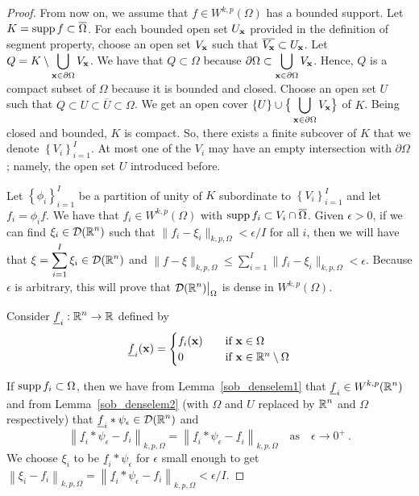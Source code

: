 \begin{proof}
 From now on, we assume that $\displaystyle f \in W^{k,p}(\Omega)$
has a bounded support.  Let
$\displaystyle K = \operatorname{supp} f \subset \overline{\Omega}$.
For each bounded open set $U_{\mathbf{x}}$ provided in the definition of
segment property, choose an open set
$V_{\mathbf{x}}$ such that $\displaystyle \overline{V_{\mathbf{x}}} \subset U_{\mathbf{x}}$.
Let
$\displaystyle Q = K \setminus \bigcup_{\mathbf{x} \in \partial \Omega} V_{\mathbf{x}}$.
We have that $Q \subset \Omega$ because
$\displaystyle \partial \Omega \subset \bigcup_{\mathbf{x}
\in \partial \Omega} V_{\mathbf{x}}$.
Hence, $Q$ is a compact subset of $\Omega$ because it is
bounded and closed.  Choose an open set $U$ such that
$Q \subset U \subset \overline{U} \subset \Omega$.
We get an open cover $\displaystyle \left\{U\right\} \cup
\big\{ \bigcup_{\mathbf{x} \in \partial \Omega} V_{\mathbf{x}} \big\}$ of $K$.
Being closed and bounded, $K$ is compact.  So, there exists a finite
subcover of $K$ that we denote $\displaystyle \left\{ V_i \right\}_{i=1}^I$.
At most one of the $V_i$ may have an empty intersection with $\partial \Omega$;
namely, the open set $U$ introduced before.

Let $\displaystyle \left\{ \phi_i \right\}_{i=1}^I$ be a partition
of unity of $K$ subordinate to $\displaystyle \left\{ V_i \right\}_{i=1}^I$
and let $\displaystyle f_i = \phi_i f$.  We have that
$\displaystyle f_i \in W^{k,p}(\Omega)$ with
$\operatorname{supp} f_i \subset V_i \cap \overline{\Omega}$.
Given $\epsilon >0$, if we can find $\displaystyle \xi_i \in \mathcal{D}(\mathbb{R}^n)$
such that $\displaystyle \|f_i - \xi_i\|_{k,p,\Omega} < \epsilon/I$ for all $i$,
then we will have that $\displaystyle \xi = \sum_{i=1}^I \xi_i \in \mathcal{D}(\mathbb{R}^n)$
and $\displaystyle \|f - \xi\|_{k,p,\Omega}
\leq \sum_{i=1}^I \|f_i - \xi_i\|_{k,p,\Omega} < \epsilon$.  Because
$\epsilon$ is arbitrary, this will prove that
$\displaystyle \mathcal{D}(\mathbb{R}^n)\big|_{\Omega}$ is dense in $W^{k,p}(\Omega)$.

Consider $\displaystyle \underline{f}_i : \mathbb{R}^n \to \mathbb{R}$ defined by
\[
\underline{f}_i(\mathbf{x})
= \begin{cases}
f_i(\mathbf{x}) & \quad \text{if} \ \mathbf{x} \in \Omega \\
0 & \quad \text{if} \ \mathbf{x} \in \mathbb{R}^n \setminus \Omega
\end{cases}
\]

If $\operatorname{supp} f_i \subset \Omega$, then we have from
Lemma~\ref{sob_denselem1} that
$\displaystyle \underline{f}_i \in W^{k,p}(\mathbb{R}^n)$
and from Lemma~\ref{sob_denselem2} (with $\Omega$ and $U$ replaced by
$\displaystyle \mathbb{R}^n$ and $\Omega$ respectively) that
$\displaystyle \underline{f}_i \ast \psi_\epsilon \in \mathcal{D}(\mathbb{R}^n)$ and
\[
\left\| \underline{f}_i \ast \psi_\epsilon - f_i \right\|_{k,p,\Omega}
= \left\| \underline{f}_i \ast \psi_\epsilon
- \underline{f}_i \right\|_{k,p,\Omega}
\quad \text{as} \quad \epsilon \to 0^+ \ .
\]
We choose $\xi_i$ to be $\underline{f}_i \ast \psi_\epsilon$
for $\epsilon$ small enough to get
$\displaystyle \left\|\xi_i - f_i\right\|_{k,p,\Omega}
= \left\| \underline{f}_i \ast \psi_\epsilon - f_i \right\|_{k,p,\Omega}
< \epsilon/I$.


\end{proof}
